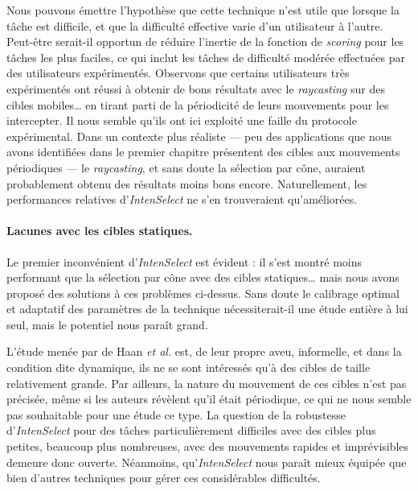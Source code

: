 	Nous pouvons émettre l'hypothèse que cette technique n'est utile que lorsque la tâche est difficile, et que la difficulté effective varie d'un utilisateur à l'autre. Peut-être serait-il opportun de réduire l'inertie de la fonction de \emph{scoring} pour les tâches les plus faciles, ce qui inclut les tâches de difficulté modérée effectuées par des utilisateurs expérimentés. Observons que certains utilisateurs très expérimentés ont réussi à obtenir de bons résultats avec le \emph{raycasting} sur des cibles mobiles\ldots{} en tirant parti de la périodicité de leurs mouvements pour les intercepter. Il nous semble qu'ils ont ici exploité une faille du protocole expérimental. Dans un contexte plus réaliste --- peu des applications que nous avons identifiées dans le premier chapitre présentent des cibles aux mouvements périodiques --- le \emph{raycasting}, et sans doute la sélection par cône, auraient probablement obtenu des résultats moins bons encore. Naturellement, les performances relatives d'\emph{IntenSelect} ne s'en trouveraient qu'améliorées.
	
	\paragraph{Lacunes avec les cibles statiques.}
	Le premier inconvénient d'\emph{IntenSelect} est évident : il s'est montré moins performant que la sélection par cône avec des cibles statiques\ldots{} mais nous avons proposé des solutions à ces problèmes ci-dessus. Sans doute le calibrage optimal et adaptatif des paramètres de la technique nécessiterait-il une étude entière à lui seul, mais le potentiel nous paraît grand.
	
	L'étude menée par de Haan \emph{et al.} est, de leur propre aveu, informelle, et dans la condition dite dynamique, ils ne se sont intéressés qu'à des cibles de taille relativement grande. Par ailleurs, la nature du mouvement de ces cibles n'est pas précisée, même si les auteurs révèlent qu'il était périodique, ce qui ne nous semble pas souhaitable pour une étude ce type. La question de la robustesse d'\emph{IntenSelect} pour des tâches particulièrement difficiles avec des cibles plus petites, beaucoup plus nombreuses, avec des mouvements rapides et imprévisibles demeure donc ouverte. Néanmoins, qu'\emph{IntenSelect} nous paraît mieux équipée que bien d'autres techniques pour gérer ces considérables difficultés.
		
